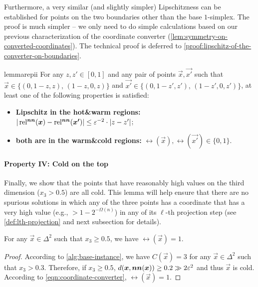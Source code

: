 Furthermore, a very similar (and slightly simpler) Lipschitzness can be established for points on the two boundaries other than the base $1$-simplex. 
The proof is much simpler -- we only need to do simple calculations based on our previous characterization of the coordinate converter (\cref{lem:symmetry-on-converted-coordinates}).
The technical proof is deferred to \cref{proof:lipschitz-of-the-converter-on-boundaries}.
\begin{restatable}[]{lemma}{repii}
    \label{lem:lipschitz-of-the-converter-on-boundaries}
    For any $z,z'\in [0,1]$ and any pair of points $\vec{x}, \vec{x'}$ such that $\vec{x}\in \{(0,1-z,z),\, (1-z,0,z)\}$ and $\vec{x'}\in \{(0,1-z',z'),\, (1-z',0,z')\}$, at least one of the following properties is satisfied:
    \begin{itemize}[itemsep=0em]
        \item {\bf Lipschitz in the hot\&warm regions:} $|\operatorname*{rel^{\boldsymbol{nn}}}(\boldsymbol{x})-\operatorname*{rel^{\boldsymbol{nn}}}(\boldsymbol{x'})|\leq \varepsilon^{-2}\cdot |z-z'|$; 
        \item {\bf both are in the warm\&cold regions:} $\rel(\vec{x}),\rel(\vec{x'})\in \{0,1\}$. 
    \end{itemize}
\end{restatable}

\paragraph{Property IV: Cold on the top}
Finally, we show that the points that have reasonably high values on the third dimension ($x_3>0.5$) are all cold. 
This lemma will help ensure that there are no spurious solutions in which any of the three points has a coordinate that has a very high value (e.g., $>1-2^{-\Omega(n)}$) in any of its $\ell$-th projection step (see \cref{def:lth-projection} and next subsection for details). 

\begin{fact}
    \label{lem:trivial-converter}
    For any $\vec{x}\in \Delta^{2}$ such that $x_3\geq 0.5$, we have $\rel(\vec{x})=1$.
\end{fact}
\begin{proof}
    According to \cref{alg:base-instance}, we have $C(\vec{x})=3$ for any $\vec{x}\in \Delta^2$ such that $x_3>0.3$. 
    Therefore, if $x_3\geq 0.5$, $d(\boldsymbol{x}, \boldsymbol{nn}(\boldsymbol{x}))\geq 0.2\gg 2\varepsilon^2$ and thus $\vec{x}$ is cold. 
    According to \cref{eqn:coordinate-converter}, $\rel(\vec{x})=1$. 
\end{proof}

